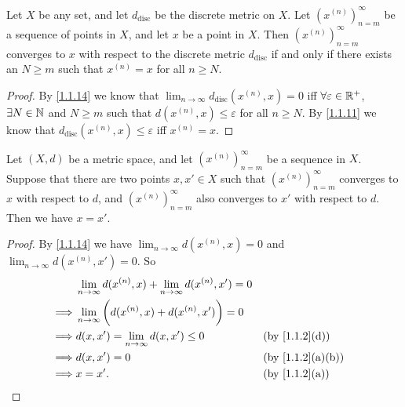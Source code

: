\begin{prop}\label{1.1.19}
  Let \(X\) be any set, and let \(d_{\text{disc}}\) be the discrete metric on \(X\).
  Let \((x^{(n)})_{n = m}^\infty\) be a sequence of points in \(X\), and let \(x\) be a point in \(X\).
  Then \((x^{(n)})_{n = m}^\infty\) converges to \(x\) with respect to the discrete metric \(d_{\text{disc}}\) if and only if there exists an \(N \geq m\) such that \(x^{(n)} = x\) for all \(n \geq N\).
\end{prop}

\begin{proof}
  By \cref{1.1.14} we know that \(\lim_{n \to \infty} d_{\text{disc}}(x^{(n)}, x) = 0\) iff \(\forall \varepsilon \in \mathbb{R}^+\), \(\exists N \in \mathbb{N}\) and \(N \geq m\) such that \(d(x^{(n)}, x) \leq \varepsilon\) for all \(n \geq N\).
  By \cref{1.1.11} we know that \(d_{\text{disc}}(x^{(n)}, x) \leq \varepsilon\) iff \(x^{(n)} = x\).
\end{proof}

\begin{prop}\label{1.1.20}
  Let \((X, d)\) be a metric space, and let \((x^{(n)})_{n = m}^\infty\) be a sequence in \(X\).
  Suppose that there are two points \(x, x' \in X\) such that \((x^{(n)})_{n = m}^\infty\) converges to \(x\) with respect to \(d\), and \((x^{(n)})_{n = m}^\infty\) also converges to \(x'\) with respect to \(d\).
  Then we have \(x = x'\).
\end{prop}

\begin{proof}
  By \cref{1.1.14} we have \(\lim_{n \to \infty} d(x^{(n)}, x) = 0\) and \(\lim_{n \to \infty} d(x^{(n)}, x') = 0\).
  So
  \begin{align*}
             & \lim_{n \to \infty} d(x^{(n)}, x) + \lim_{n \to \infty} d(x^{(n)}, x') = 0                                     \\
    \implies & \lim_{n \to \infty} \bigg(d(x^{(n)}, x) + d(x^{(n)}, x')\bigg) = 0                                             \\
    \implies & d(x, x') = \lim_{n \to \infty} d(x, x') \leq 0                             &  & \text{(by \cref{1.1.2}(d))}    \\
    \implies & d(x, x') = 0                                                               &  & \text{(by \cref{1.1.2}(a)(b))} \\
    \implies & x = x'.                                                                    &  & \text{(by \cref{1.1.2}(a))}
  \end{align*}
\end{proof}

